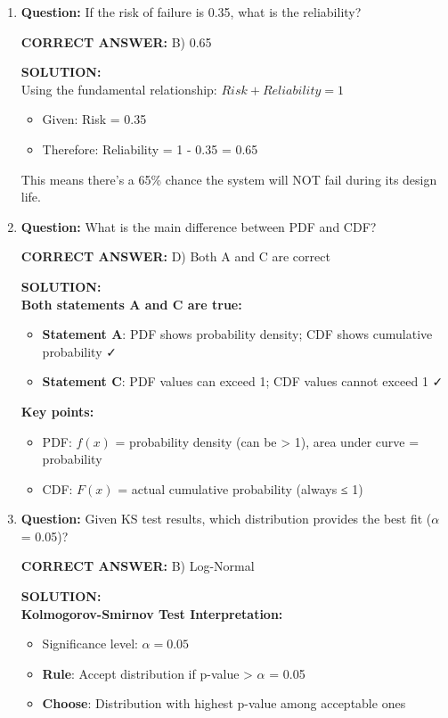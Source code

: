 \documentclass[11pt,a4paper]{article}
\newenvironment{correctanswer}
    {\color{correct}\textbf{CORRECT ANSWER: }}
    {}
\newenvironment{solutionbox}
    {\color{solution}\begin{framed}\textbf{SOLUTION:}\\\vspace{0.2cm}}
    {\end{framed}}
\begin{document}
\begin{enumerate}
\item \textbf{Question:} If the risk of failure is 0.35, what is the reliability?

\begin{correctanswer}
B) 0.65
\end{correctanswer}

\begin{solutionbox}
Using the fundamental relationship: $Risk + Reliability = 1$
\begin{itemize}[nosep]
    \item Given: Risk = 0.35
    \item Therefore: Reliability = 1 - 0.35 = 0.65
\end{itemize}
This means there's a 65\% chance the system will NOT fail during its design life.
\end{solutionbox}

\item \textbf{Question:} What is the main difference between PDF and CDF?

\begin{correctanswer}
D) Both A and C are correct
\end{correctanswer}

\begin{solutionbox}
\textbf{Both statements A and C are true:}
\begin{itemize}[nosep]
    \item \textbf{Statement A}: PDF shows probability density; CDF shows cumulative probability ✓
    \item \textbf{Statement C}: PDF values can exceed 1; CDF values cannot exceed 1 ✓
\end{itemize}
\textbf{Key points:}
\begin{itemize}[nosep]
    \item PDF: $f(x)$ = probability density (can be > 1), area under curve = probability
    \item CDF: $F(x)$ = actual cumulative probability (always ≤ 1)
\end{itemize}
\end{solutionbox}

\item \textbf{Question:} Given KS test results, which distribution provides the best fit ($\alpha$ = 0.05)?

\begin{correctanswer}
B) Log-Normal
\end{correctanswer}

\begin{solutionbox}
\textbf{Kolmogorov-Smirnov Test Interpretation:}
\begin{itemize}[nosep]
    \item Significance level: $\alpha = 0.05$
    \item \textbf{Rule}: Accept distribution if p-value > $\alpha$ = 0.05
    \item \textbf{Choose}: Distribution with highest p-value among acceptable ones
\end{itemize}


\end{solutionbox}
\end{enumerate}
\end{document}
